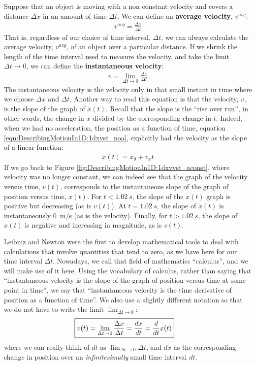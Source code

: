 Suppose that an object is moving with a non constant velocity and covers a distance $\Delta x$ in an amount of time $\Delta t$. We can define an \textbf{average velocity}, $v^{avg}$:
\begin{align*}
v^{avg}= \frac{\Delta x}{\Delta t}
\end{align*}
That is, regardless of our choice of time interval, $\Delta t$, we can always calculate the average velocity, $v^{avg}$, of an object over a particular distance. If we shrink the length of the time interval used to measure the velocity, and take the limit $\Delta t\to 0$, we can define the \textbf{instantaneous velocity}:
\begin{align*}
v = \lim_{\Delta t\to 0} \frac{\Delta x}{\Delta t}
\end{align*}
The instantaneous velocity is the velocity only in that small instant in time where we choose $\Delta x$ and $\Delta t$. Another way to read this equation is that the velocity, $v$, is the slope of the graph of $x(t)$. Recall that the slope is the ``rise over run'', in other words, the change in $x$ divided by the corresponding change in $t$. Indeed, when we had no acceleration, the position as a function of time, equation \ref{eqn:DescribingMotionIn1D:1dxvst_noa}, explicitly had the velocity as the slope of a linear function:
 \begin{align*}
 x(t) = x_0+v_xt
 \end{align*}
 If we go back to Figure \ref{fig:DescribingMotionIn1D:1dxvvst_aconst}, where velocity was no longer constant, we can indeed see that the graph of the velocity versus time, $v(t)$, corresponds to the instantaneous slope of the graph of position versus time, $x(t)$. For $t<\SI{1.02}{s}$, the slope of the $x(t)$ graph is positive but decreasing (as is $v(t)$). At $t=\SI{1.02}{s}$, the slope of $x(t)$ is instantaneously \SI{0}{m/s} (as is the velocity). Finally, for $t>\SI{1.02}{s}$, the slope of $x(t)$ is negative and increasing in magnitude, as is $v(t)$.

Leibniz and Newton were the first to develop mathematical tools to deal with calculations that involve quantities that tend to zero, as we have here for our time interval $\Delta t$. Nowadays, we call that field of mathematics ``calculus'', and we will make use of it here. Using the vocabulary of calculus, rather than saying that ``instantaneous velocity is the slope of the graph of position versus time at some point in time'', we say that ``instantaneous velocity is the time derivative of position as a function of time''. We also use a slightly different notation so that we do not have to write the limit $\lim_{\Delta t\to 0}$:
\begin{align}
\label{eqn:DescribingMotionIn1D:vdef}
\Aboxed{v(t)=\lim_{\Delta t\to 0} \frac{\Delta x}{\Delta t}=\frac{dx}{dt}=\frac{d}{dt} x(t)}
\end{align}
where we can really think of $dt$ as $\lim_{\Delta t\to 0}\Delta t$, and $dx$ as the corresponding change in position over an \textit{infinitesimally} small time interval $dt$.

